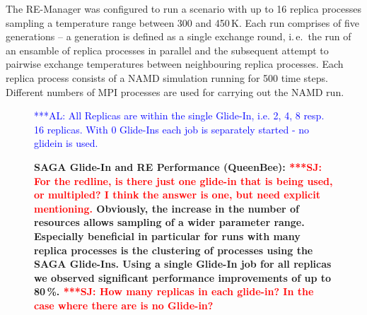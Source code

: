 \documentclass{rspublic}
\newcommand{\alnote}[1]{ {\textcolor{blue} { ***AL: #1 }}}
\newcommand{\jhanote}[1]{ {\textcolor{red} { ***SJ: #1 }}}
\newcommand{\alnote}[1]{}
\newcommand{\jhanote}[1]{}
\begin{document}
{The RE-Manager was configured to run a scenario with up to 16 replica processes 
sampling a temperature range between 300 and 450\,K. Each run comprises of
five generations -- a generation is defined as a single exchange round, i.\,e.\ the
run of an ensamble of replica processes in parallel and the subsequent attempt 
to pairwise exchange temperatures between neighbouring replica processes. 
Each replica process consists of a NAMD simulation running
for 500 time steps. Different numbers of MPI processes are used for carrying out
the NAMD run.

\begin{figure}[th]
    \centering      
        \caption{\footnotesize \bf SAGA Glide-In and RE Performance
          (QueenBee): \jhanote{For the redline, is there just one
            glide-in that is being used, or multipled? I think the
            answer is one, but need explicit mentioning.} 
          Obviously,
          the increase in the number of resources allows sampling of a
          wider parameter range. Especially beneficial in particular
          for runs with many replica processes is the clustering of
          processes using the SAGA Glide-Ins. Using a single Glide-In
          job for all replicas we observed significant performance 
          improvements of up to 80\,\%.
          \jhanote{How many
            replicas in each glide-in? In the case where there are is
            no Glide-in?}}     
           \alnote{All Replicas are within the single Glide-In, i.e. 2, 4, 8 resp. 16 replicas.
           With 0 Glide-Ins each job is separately started - no glidein is used.}
    \label{fig:perf_remd_glidin}
\end{figure} 

}
\end{document}

